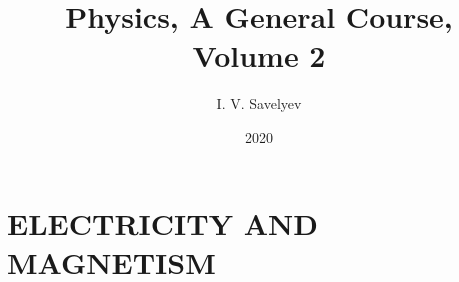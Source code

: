 \documentclass[12pt, b5paper, twoside, fleqn]{book}
\title{Physics, A General Course, Volume 2}
\author{I. V. Savelyev}
\date{2020}
\numberwithin{equation}{chapter}
\begin{document}
\setlength{\abovedisplayskip}{3pt}
\setlength{\belowdisplayskip}{3pt}
\setlength{\abovedisplayshortskip}{3pt}
\setlength{\belowdisplayshortskip}{3pt}

\frontmatter


\cleardoublepage

\cleardoublepage

\cleardoublepage
{\hypersetup{linkcolor=black!80}
	\tableofcontents
}
\cleardoublepage

\mainmatter

% 

\part{ELECTRICITY AND MAGNETISM}\label{part:A}
\cleardoublepage

\cleardoublepage
%
\cleardoublepage
%
\cleardoublepage
%
\cleardoublepage
%
\cleardoublepage
%
\cleardoublepage
%
\cleardoublepage
%
\cleardoublepage
%
\cleardoublepage
%
\cleardoublepage
%
\cleardoublepage
%
\cleardoublepage
%
\cleardoublepage

\cleardoublepage
%
\cleardoublepage
%
\cleardoublepage

\cleardoublepage
%
\cleardoublepage
%
\cleardoublepage
%
\cleardoublepage
%
\cleardoublepage
%
\cleardoublepage
%
\cleardoublepage
%
\printindex

\cleardoublepage

\end{document}
